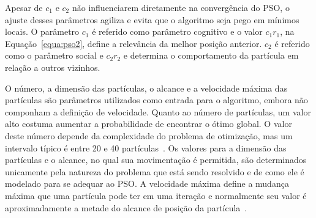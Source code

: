 Apesar de $c_1$ e $c_2$ não influenciarem diretamente na convergência do PSO, o ajuste desses parâmetros agiliza e evita que o algoritmo seja pego em mínimos locais. O parâmetro $c_1$ é referido como parâmetro cognitivo e o valor $c_1r_1$, na Equação~\ref{equa:pso2}, define a relevância da melhor posição anterior. $c_2$ é referido como o parâmetro social e $c_2r_2$ e determina o comportamento da partícula em relação a outros vizinhos.

O número, a dimensão das partículas, o alcance e a velocidade máxima das partículas são parâmetros utilizados como entrada para o algoritmo, embora não componham a definição de velocidade. Quanto ao número de partículas, um valor alto costuma aumentar a probabilidade de encontrar o ótimo global. O valor deste número depende da complexidade do problema de otimização, mas um intervalo típico é entre 20 e 40 partículas~\cite {rodriguez2014}. Os valores para a dimensão das partículas e o alcance, no qual sua movimentação é permitida, são determinados unicamente pela natureza do problema que está sendo resolvido e de como ele é modelado para se adequar ao PSO. A velocidade máxima define a mudança máxima que uma partícula pode ter em uma iteração e normalmente seu valor é aproximadamente a metade do alcance de posição da partícula~\cite{rodriguez2014}.